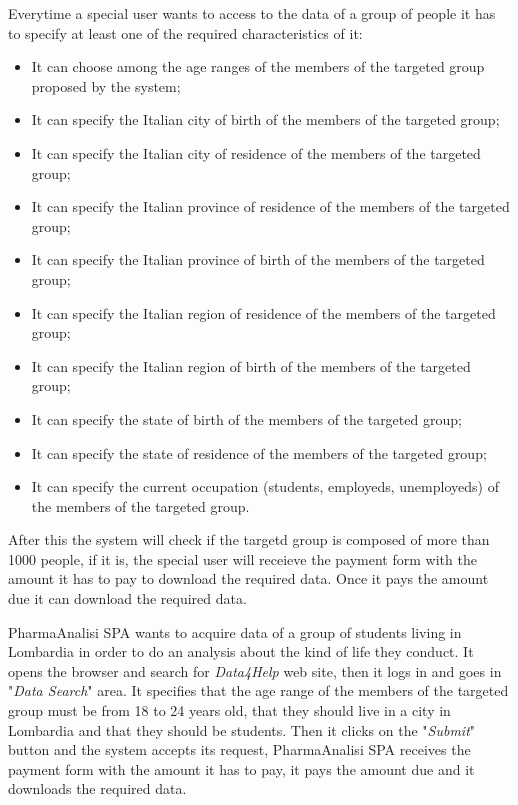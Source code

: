 Everytime a special user wants to access to the data of a group of people it has to specify at least one of the required characteristics of it:
\begin{itemize}
  \item It can choose among the age ranges of the members of the targeted group proposed by the system;
  \item It can specify the Italian city of birth of the members of the targeted group;
  \item It can specify the Italian city of residence of the members of the targeted group;
  \item It can specify the Italian province of residence of the members of the targeted group;
  \item It can specify the Italian province of birth of the members of the targeted group;
  \item It can specify the Italian region of residence of the members of the targeted group;
  \item It can specify the Italian region of birth of the members of the targeted group;
  \item It can specify the state of birth of the members of the targeted group;
  \item It can specify the state of residence of the members of the targeted group;
  \item It can specify the current occupation (students, employeds, unemployeds) of the members of the targeted group.
\end{itemize}
After this the system will check if the targetd group is composed of more than 1000 people, if it is, the special user will receieve the payment form with the amount it has to pay to download the required data. Once it pays the amount due it can download the required data.

PharmaAnalisi SPA wants to acquire data of a group of students living in Lombardia in order to do an analysis about the kind of life they conduct. It opens the browser and search for \textit{Data4Help} web site, then it logs in and goes in "\textit{Data Search}" area. It specifies that the age range of the members of the targeted group must be from 18 to 24 years old, that they should live in a city in Lombardia and that they should be students. Then it clicks on the "\textit{Submit}" button and the system accepts its request, PharmaAnalisi SPA receives the payment form with the amount it has to pay, it pays the amount due and it downloads the required data.

